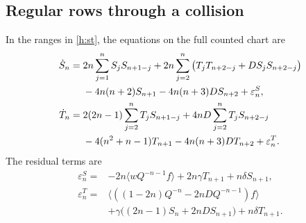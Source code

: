 \subsection{Regular rows through a collision}

\begin{theorem}\label{h:regularthm}
In the ranges in \eqref{h:st}, the equations on the full counted
chart are
\begin{align}
 \dot S_n={}&2n\sum_{j=1}^n S_jS_{n+1-j}
   +2n\sum_{j=2}^n\big(T_jT_{n+2-j}+DS_jS_{n+2-j}\big)\notag\\
 &-4n(n+2)S_{n+1}-4n(n+3)DS_{n+2}+\varepsilon^S_n ,
 \label{h:S-row}\\
 \dot T_n={}&2(2n-1)\sum_{j=2}^n T_jS_{n+1-j}
    +4nD\sum_{j=2}^n T_jS_{n+2-j}\notag\\
 &-4(n^2+n-1)T_{n+1}-4n(n+3)DT_{n+2}+\varepsilon^T_n .
 \label{h:T-row}
\end{align}
The residual terms are
\begin{equation}\label{h:ST-force}
\begin{split}
 \varepsilon^S_n={}&-2n\langle wQ^{-n-1}f\rangle
                      +2n\gamma T_{n+1}+n\delta S_{n+1},\\
 \varepsilon^T_n={}&\langle ((1-2n)Q^{-n}-2nDQ^{-n-1})f\rangle\\
                  &+\gamma\big((2n-1)S_n+2nDS_{n+1}\big)
                      +n\delta T_{n+1}.
\end{split}
\end{equation}
\end{theorem}

